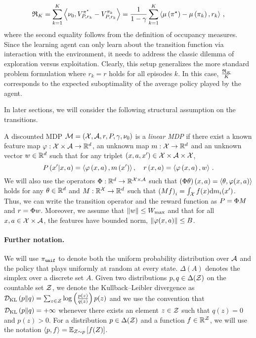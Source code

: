 %
\begin{equation*}
    \Reg_K = \sumkK \inp{\nu_0, V_{P, r_k}^{\pi^\star} - V_{P, r_k}^{\pi_k}} = \frac{1}{1 - \gamma} \sumkK \inp{\mu \spr{\pi^\star} - \mu \spr{\pi_k}, r_k}\,,
\end{equation*}
%
where the second equality follows from the definition of occupancy measures. Since the learning agent can only learn about the transition function via interaction with the environment, it needs to address the classic dilemma of exploration versus exploitation. Clearly, this setup generalizes the more standard problem formulation where $r_k = r$ holds for all episodes $k$. In this case, $\frac{\Reg_K}{K}$ corresponds to the expected suboptimality of the average policy played by the agent.

In later sections, we will consider the following structural assumption on the transitions.
%
\begin{assumption}\label{ass:LinMDP}
    A discounted MDP $\cM = \spr{\cX, \cA, r, P, \gamma, \nu_0}$ is a \emph{linear MDP} if there exist a known feature map $\phi: \cX \times \cA \rightarrow \bbR^d$, an unknown map $m: \cX \rightarrow \bbR^d$ and an unknown vector $w \in \bbR^d$ such that for any triplet $\spr{x, a, x'} \in \cX \times \cA \times \cX$,
    \begin{equation*}
        P \spr{x' \middle| x, a} = \inp{\phi \spr{x, a}, m \spr{x'}}, \quad r \spr{x, a} = \inp{\phi \spr{x, a}, w}\,.
    \end{equation*}
    We will also use the operators $\phim: \mathbb{R}^d \rightarrow \real^{\X\times\A }$ such that $\pa{\Phi\theta}\pa{x,a} = \iprod{\theta}{\varphi(x,a)}$ holds for any $\theta\in\real^d$ and $M: \real^\X \rightarrow \mathbb{R}^d$ such that $\pa{Mf}_i = \int_\X f(x)\dd m_i(x')$. Thus, we can write the transition operator and the reward function as $P=\phim M$ and $r = \phim w$. Moreover, we assume that $\norm{w}\leq \WMAX$ and that for all $x,a\in\X\times\A$, the features have bounded norm, \ie $\norm{\phi(x,a)}\leq B$.
\end{assumption}

\paragraph{Further notation.} We will use $\piunif$ to denote both the uniform probability distribution over $\cA$ and the policy that plays uniformly at random at every state. $\Delta (A)$ denotes the simplex over a discrete set $A$. Given two distributions $p,q \in \Delta(\cZ)$ on the countable set $\cZ$, we denote the Kullback--Leibler divergence as $\DDKL{p}{q} = \sum_{z\in\cZ} \log \brr{\frac{p(z)}{q(z)}} p(z)$ and we use the convention that $\DDKL{p}{q}= +\infty$ whenever there exists an element $z\in \cZ$ such that $ q(z) = 0$ and $p(z) > 0$. For a distribution $p\in\Delta(\cZ)$ and a function $f\in\real^{\cZ}$, we will use the notation $\iprod{p}{f} = \EEs{f(Z)}{Z\sim p}$.
